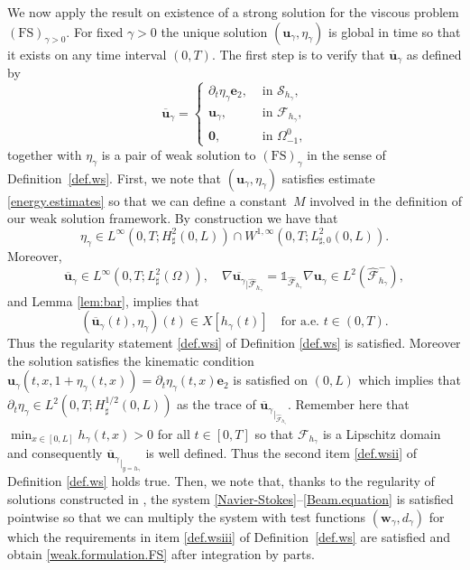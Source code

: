 \documentclass[JEP,XML,SOM,Unicode,NoFloatCountersInSection]{cedram}
\let\mathcal\mathscr
\newcommand{\FS}{\mathrm{FS}}
\theoremstyle{remark}
\theoremstyle{definition}
\newcommand{\ug}{\boldsymbol{u}}
\newcommand{\wg}{\boldsymbol{w}}
\newcommand{\BS}[1]{\boldsymbol{#1}}
\begin{document}
We now apply the result on existence of a strong solution for the viscous problem $(\FS)_{\gamma>0}$. For fixed $\gamma >0$ the unique solution $(\ug_\gamma,\eta_\gamma)$ is global in time so that it exists on any time interval $(0,T)$.
The first step is to verify that $\overline{\ug}_{\gamma}$ as defined by
\[
\overline{\ug}_{\gamma} =
\begin{cases}
\partial_t \eta_{\gamma} \BS{e}_2, & \text{ in $\mathcal S_{h_{\gamma}}$,} \\
\ug_{\gamma}, & \text{ in $\mathcal F_{h_{\gamma}}$,} \\
\BS{0}, & \text{ in $\Omega_{-1}^0$,}
\end{cases}
\]
together with $\eta_{\gamma}$ is a pair of weak solution
to $(\FS)_{\gamma}$ in the sense of Definition~\ref{def.ws}. First, we note that $(\ug_\gamma,\eta_\gamma)$
satisfies estimate \eqref{energy.estimates} so that we can define a constant~$M$ involved in the definition
of our weak solution framework. By construction we have that
\[
\eta_{\gamma} \in L^{\infty}(0,T;H^{2}_{\sharp}(0,L)) \cap W^{1,\infty}(0,T;L^2_{\sharp, 0}(0,L)).
\]
Moreover, \[
\overline{\ug}_{\gamma} \in L^{\infty}(0,T ; L^2_{\sharp}(\Omega)), \quad
\nabla \overline{\ug_{\gamma}}_{|{\widehat{\mathcal F}_{h_{\gamma}}}} = \mathds{1}_{\widehat{\mathcal F}_{h_{\gamma}}}\nabla \ug_{\gamma} \in L^2(\widehat{\mathcal F}^{-}_{h_{\gamma}}),
\]
and
Lemma \ref{lem:bar}, implies that
\[
(\overline{\ug}_{\gamma}(t),\eta_{\gamma})(t) \in X[h_{\gamma}(t)] \quad\text{for a.e. $t \in (0,T)$}.
\]
Thus the regularity statement \eqref{def.wsi} of Definition \ref{def.ws} is satisfied. Moreover the solution satisfies the kinematic condition $\ug_\gamma(t, x, 1+\eta_\gamma(t, x))=\partial_t\eta_\gamma(t,x)\BS{e}_2$ is satisfied on $(0, L)$ which implies that $\partial_t\eta_\gamma\in L^2(0, T ; H^{1/2}_\sharp(0, L))$ as the trace of ${\overline{\ug}_{\gamma}}_{|_{\widehat{\mathcal F}_{h_\gamma}}}$. Remember here that $\min_{x\in [0, L]} h_\gamma(t,x) >0$ for all $t\in [0, T]$ so that $\mathcal{F}_{h_\gamma}$ is a Lipschitz domain and consequently ${\overline{\ug}_{\gamma}}_{\vert_{y=h_\gamma}}$ is well defined. Thus the second item \eqref{def.wsii} of Definition \ref{def.ws} holds true. Then, we note that, thanks to the regularity of solutions constructed
in \hbox{\cite[Th.\,1]{Grandmont-Hillairet}}, the system \eqref{Navier-Stokes}--\eqref{Beam.equation} is satisfied pointwise so that
we can multiply the system with test functions $(\wg_{\gamma},d_{\gamma})$ for which the requirements in item
\eqref{def.wsiii} of Definition~\ref{def.ws} are satisfied and obtain \eqref{weak.formulation.FS} after integration by parts.
\end{document}
